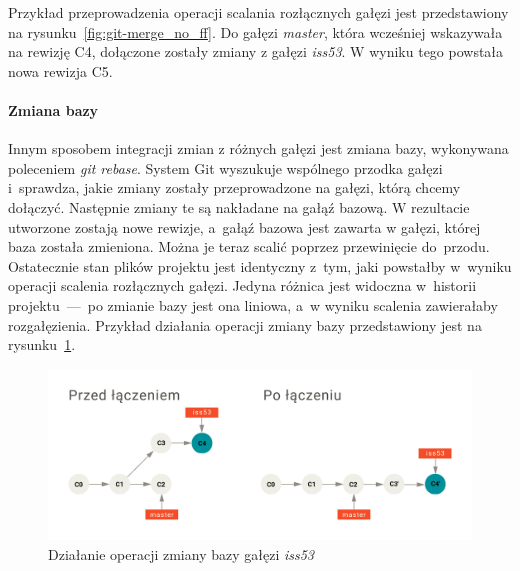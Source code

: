 \documentclass[12pt,a4paper,polish,thesis]{dcsbook}
\begin{document}
	Przykład przeprowadzenia operacji scalania rozłącznych gałęzi jest przedstawiony na rysunku~\ref{fig:git-merge_no_ff}. Do gałęzi \textit{master}, która wcześniej wskazywała na rewizję C4, dołączone zostały zmiany z gałęzi \textit{iss53}. W wyniku tego powstała nowa rewizja C5.

	\FloatBarrier

	\paragraph{Zmiana bazy}

	Innym sposobem integracji zmian z różnych gałęzi jest zmiana bazy, wykonywana poleceniem \textit{git rebase}. System Git wyszukuje wspólnego przodka gałęzi i~sprawdza, jakie zmiany zostały przeprowadzone na gałęzi, którą chcemy dołączyć. Następnie zmiany te są nakładane na gałąź bazową. W rezultacie utworzone zostają nowe rewizje, a~gałąź bazowa jest zawarta w gałęzi, której baza została zmieniona. Można je teraz scalić poprzez przewinięcie do~przodu. Ostatecznie stan plików projektu jest identyczny z~tym, jaki powstałby w~wyniku operacji scalenia rozłącznych gałęzi. Jedyna różnica jest widoczna w~historii projektu~---~po zmianie bazy jest ona liniowa, a~w wyniku scalenia zawierałaby rozgałęzienia. Przykład działania operacji zmiany bazy przedstawiony jest na rysunku~\ref{fig:git-rebase}.

	\begin{figure}[h]
		\centering
		\includegraphics[width=13cm]{git-rebase}
		\caption{Działanie operacji zmiany bazy gałęzi \textit{iss53} }
		\label{fig:git-rebase}
	\end{figure}
	\FloatBarrier
\end{document}
